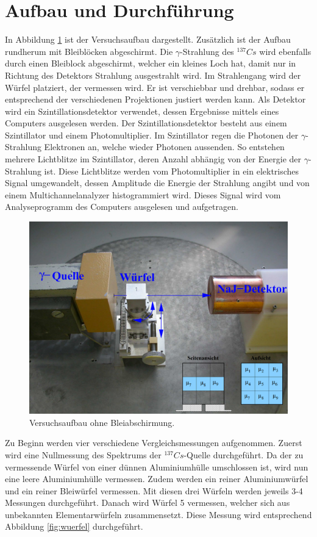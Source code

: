 \section{Aufbau und Durchführung}

In Abbildung \ref{fig:aufbau} ist der Versuchsaufbau dargestellt. Zusätzlich ist der Aufbau rundherum mit Bleiblöcken abgeschirmt. Die $\gamma$-Strahlung
des ${}^{137}Cs$ wird ebenfalls durch einen Bleiblock abgeschirmt, welcher ein kleines Loch hat, damit nur in Richtung des Detektors Strahlung
ausgestrahlt wird. Im Strahlengang wird der Würfel platziert, der vermessen wird. Er ist verschiebbar und drehbar, sodass er entsprechend der verschiedenen
Projektionen justiert werden kann. Als Detektor wird ein Szintillationsdetektor verwendet, dessen Ergebnisse mittels eines Computers ausgelesen werden.
Der Szintillationsdetektor besteht aus einem Szintillator und einem Photomultiplier. Im Szintillator regen die Photonen der $\gamma$-Strahlung Elektronen an,
welche wieder Photonen aussenden. So entstehen mehrere Lichtblitze im Szintillator, deren Anzahl abhängig von der Energie der $\gamma$-Strahlung ist. Diese
Lichtblitze werden vom Photomultiplier in ein elektrisches Signal umgewandelt, dessen Amplitude die Energie der Strahlung angibt und von einem
Multichannelanalyzer histogrammiert wird. Dieses Signal wird vom Analyseprogramm des Computers ausgelesen und aufgetragen.

\begin{figure}
  \centering
  \includegraphics[scale=0.5]{graphics/Aufbau.png}
  \caption{Versuchsaufbau ohne Bleiabschirmung.\cite{anleitung}}
  \label{fig:aufbau}
\end{figure}

Zu Beginn werden vier verschiedene Vergleichsmessungen aufgenommen. Zuerst wird eine Nullmessung des Spektrums der ${}^{137}Cs$-Quelle durchgeführt.
Da der zu vermessende Würfel von einer dünnen Aluminiumhülle umschlossen ist, wird nun eine leere Aluminiumhülle vermessen. Zudem werden ein reiner
Aluminiumwürfel und ein reiner Bleiwürfel vermessen. Mit diesen drei Würfeln werden jeweils 3-4 Messungen durchgeführt. Danach wird Würfel 5 vermessen,
welcher sich aus unbekannten Elementarwürfeln zusammensetzt. Diese Messung wird entsprechend Abbildung \ref{fig:wuerfel} durchgeführt.
